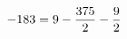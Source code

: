 \documentclass[preview]{standalone}
\begin{document}
\begin{align*}
\special{dvisvgm:raw <g id='unique000'>}-183 = 9 - \frac{375}{2} - \frac{9}{2}\special{dvisvgm:raw </g>}
\end{align*}
\end{document}
